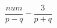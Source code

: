 \begin{ex}[type=expression]
	\begin{condition}
		\( \dfrac{num}{p-q}-\dfrac{3}{p+q} \)
	\end{condition}
\end{ex}